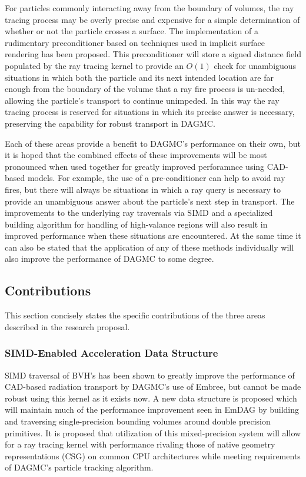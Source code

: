 \documentclass[12pt, a4paper]{article}
\begin{document}
For particles commonly interacting away from the boundary of volumes, the ray tracing process may be overly precise and expensive for a simple determination of whether or not the particle crosses a surface. The implementation of a rudimentary preconditioner based on techniques used in implicit surface rendering has been proposed. This preconditioner will store a signed distance field populated by the ray tracing kernel to provide an $O(1)$ check for unambiguous situations in which both the particle and its next intended location are far enough from the boundary of the volume that a ray fire process is un-needed, allowing the particle's transport to continue unimpeded. In this way the ray tracing process is reserved for situations in which its precise answer is necessary, preserving the capability for robust transport in DAGMC.

Each of these areas provide a benefit to DAGMC's performance on their own, but it is hoped that the combined effects of these improvements will be most pronounced when used together for greatly improved perforamnce using CAD-based models. For example, the use of a pre-conditioner can help to avoid ray fires, but there will always be situations in which a ray query is necessary to provide an unambiguous answer about the particle's next step in transport. The improvements to the underlying ray traversals via SIMD and a specialized building algorithm for handling of high-valance regions will also result in improved performance when these situations are encountered. At the same time it can also be stated that the application of any of these methods individually will also improve the performance of DAGMC to some degree.

\subsection{Contributions}

This section concisely states the specific contributions of the three areas described in the research proposal.

\subsubsection{SIMD-Enabled Acceleration Data Structure}

SIMD traversal of BVH's has been shown to greatly improve the performance of CAD-based radiation transport by DAGMC's use of Embree, but cannot be made robust using this kernel as it exists now. A new data structure is proposed which will maintain much of the performance improvement seen in EmDAG by building and traversing single-precision bounding volumes around double precision primitives. It is proposed that utilization of this mixed-precision system will allow for a ray tracing kernel with performance rivaling those of native geometry representations (CSG) on common CPU architectures while meeting requirements of DAGMC's particle tracking algorithm.
\end{document}
